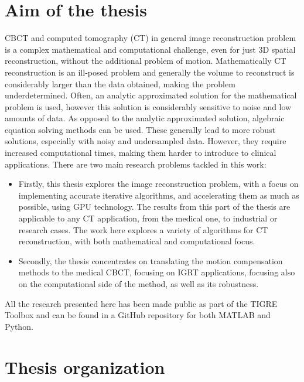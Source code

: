 
\section{Aim of the thesis}

CBCT and computed tomography (CT) in general image reconstruction problem is a complex mathematical and computational challenge, even for just 3D spatial reconstruction, without the additional problem of motion. Mathematically CT reconstruction is an ill-posed problem and generally the volume to reconstruct is considerably larger than the data obtained, making the problem underdetermined. Often, an analytic approximated solution for the  mathematical problem is used, however this solution is considerably sensitive to noise and low amounts of data. As opposed to the analytic approximated solution, algebraic equation solving methods can be used. These generally lead to more robust solutions, especially with noisy and undersampled data. However, they require increased computational times, making them harder to introduce to clinical applications. There are two main research problems tackled in this work:

\begin{itemize}
\item Firstly, this thesis explores the image reconstruction problem, with a focus on implementing accurate iterative algorithms, and accelerating them as much as possible, using GPU technology. The results from this part of the thesis are applicable to any CT application, from the medical one, to industrial or research cases. The work here explores a variety of algorithms for CT reconstruction, with both mathematical and computational focus.
\item Secondly, the thesis concentrates on translating the motion compensation methods to the medical CBCT, focusing on  IGRT applications, focusing also on the computational side of the method, as well as its robustness.
\end{itemize}

All the research presented here has been made public as part of the TIGRE Toolbox\cite{TIGRE} and can be found in a GitHub repository\cite{TIGREweb} for both MATLAB and Python. 

\section{Thesis organization}


